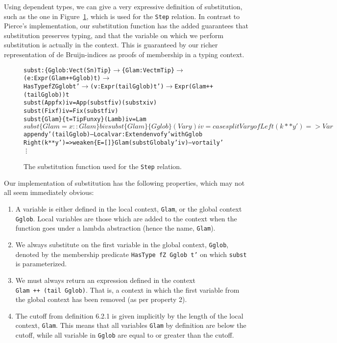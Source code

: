 Using dependent types, we can give a very expressive definition of substitution, such as the one in Figure~\ref{fig:subst}, which is used for the \texttt{Step} relation. In contrast to Pierce's implementation, our substitution function has the added guarantees that substitution preserves typing, and that the variable on which we perform substitution is actually in the context. This is guaranteed by our richer representation of de Bruijn-indices as proofs of membership in a typing context.  
\begin{figure}
\begin{alltt}
subst : \{Gglob : Vect (S n) Tip\} \(\rightarrow\) \{Glam: Vect m Tip\} \(\rightarrow\) (e: Expr (Glam ++ Gglob) t)\(\rightarrow\) 
        HasType fZ Gglob t' \(\rightarrow\) (v: Expr (tail Gglob) t') \(\rightarrow\) Expr (Glam ++ (tail Gglob)) t
subst                     (App f x) i v = App (subst f i v) (subst x i v)
subst                       (Fix f) i v = Fix (subst f i v)
subst \{Glam\} \{t=TipFun x y\} (Lam b) i v = Lam $ subst \{Glam = x :: Glam\} b i v
subst \{Glam\} \{Gglob\}        (Var y) i v = 
  case splitVar y of
   Left  (k ** y') => Var $ append y' (tail Gglob) -- Local var: Extend env of y' with Gglob
   Right (k ** y') => weaken \{E=[]\} Glam (substGlobal y' i v) -- v or tail y'
\vdots
\end{alltt}
\caption{The substitution function used for the \texttt{Step} relation.}
\label{fig:subst}
\end{figure}
Our implementation of substitution has the following properties, which may not all seem immediately obvious:
\begin{enumerate}
\item A variable is either defined in the local context, \texttt{Glam}, or the global context \texttt{Gglob}. Local variables are those which are added to the context when the function goes under a lambda abstraction (hence the name, \texttt{Glam}).
\item We always substitute on the first variable in the global context, \texttt{Gglob}, denoted by the membership predicate \texttt{HasType fZ Gglob t'} on which \texttt{subst} is parameterized.
\item We must always return an expression defined in the context \texttt{Glam~++~(tail~Gglob)}. That is, a context in which the first variable from the global context has been removed (as per property 2).
\item The cutoff from definition 6.2.1 is given implicitly by the length of the local context, \texttt{Glam}. This means that all variables \texttt{Glam} by definition are below the cutoff, while all variable in \texttt{Gglob} are equal to or greater than the cutoff.
\end{enumerate}

